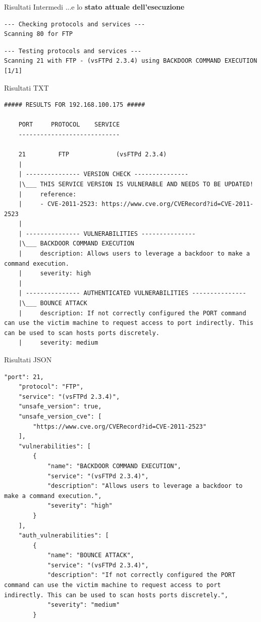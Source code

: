 \begin{frame}[fragile]{Risultati Intermedi}
...e lo \textbf{stato attuale dell'esecuzione}
\begin{lstlisting}[style=statale, basicstyle=\tiny]
--- Checking protocols and services ---
Scanning 80 for FTP
\end{lstlisting}
\begin{lstlisting}[style=statale, basicstyle=\tiny]
--- Testing protocols and services ---  
Scanning 21 with FTP - (vsFTPd 2.3.4) using BACKDOOR COMMAND EXECUTION [1/1]
\end{lstlisting}
\end{frame}


\begin{frame}[fragile]{Risultati TXT}
    \begin{lstlisting}[style=statale, basicstyle=\tiny]
    ##### RESULTS FOR 192.168.100.175 #####

    PORT 	 PROTOCOL 	 SERVICE
    ----------------------------
    
    21         FTP             (vsFTPd 2.3.4)             
    |
    | --------------- VERSION CHECK ---------------
    |\___ THIS SERVICE VERSION IS VULNERABLE AND NEEDS TO BE UPDATED!
    |     reference:
    |     - CVE-2011-2523: https://www.cve.org/CVERecord?id=CVE-2011-2523
    |
    | --------------- VULNERABILITIES ---------------
    |\___ BACKDOOR COMMAND EXECUTION
    |     description: Allows users to leverage a backdoor to make a command execution.
    |     severity: high
    |
    | --------------- AUTHENTICATED VULNERABILITIES ---------------
    |\___ BOUNCE ATTACK
    |     description: If not correctly configured the PORT command can use the victim machine to request access to port indirectly. This can be used to scan hosts ports discretely.
    |     severity: medium
    \end{lstlisting}
\end{frame}


\begin{frame}[fragile]{Risultati JSON}
\begin{lstlisting}[style=statale, basicstyle=\tiny]
    "port": 21,
    "protocol": "FTP",
    "service": "(vsFTPd 2.3.4)",
    "unsafe_version": true,
    "unsafe_version_cve": [
        "https://www.cve.org/CVERecord?id=CVE-2011-2523"
    ],
    "vulnerabilities": [
        {
            "name": "BACKDOOR COMMAND EXECUTION",
            "service": "(vsFTPd 2.3.4)",
            "description": "Allows users to leverage a backdoor to make a command execution.",
            "severity": "high"
        }
    ],
    "auth_vulnerabilities": [
        {
            "name": "BOUNCE ATTACK",
            "service": "(vsFTPd 2.3.4)",
            "description": "If not correctly configured the PORT command can use the victim machine to request access to port indirectly. This can be used to scan hosts ports discretely.",
            "severity": "medium"
        }
    \end{lstlisting}
\end{frame}


